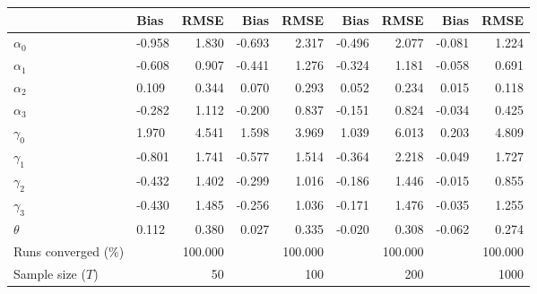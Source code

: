 
\begin{tabular}[t]{llrrrrrrr}
\toprule
  & Bias & RMSE & Bias & RMSE & Bias & RMSE & Bias & RMSE\\
\midrule
$\alpha_{0}$ & -0.958 & 1.830 & -0.693 & 2.317 & -0.496 & 2.077 & -0.081 & 1.224\\
$\alpha_{1}$ & -0.608 & 0.907 & -0.441 & 1.276 & -0.324 & 1.181 & -0.058 & 0.691\\
$\alpha_{2}$ & 0.109 & 0.344 & 0.070 & 0.293 & 0.052 & 0.234 & 0.015 & 0.118\\
$\alpha_{3}$ & -0.282 & 1.112 & -0.200 & 0.837 & -0.151 & 0.824 & -0.034 & 0.425\\
$\gamma_{0}$ & 1.970 & 4.541 & 1.598 & 3.969 & 1.039 & 6.013 & 0.203 & 4.809\\
$\gamma_{1}$ & -0.801 & 1.741 & -0.577 & 1.514 & -0.364 & 2.218 & -0.049 & 1.727\\
$\gamma_{2}$ & -0.432 & 1.402 & -0.299 & 1.016 & -0.186 & 1.446 & -0.015 & 0.855\\
$\gamma_{3}$ & -0.430 & 1.485 & -0.256 & 1.036 & -0.171 & 1.476 & -0.035 & 1.255\\
$\theta$ & 0.112 & 0.380 & 0.027 & 0.335 & -0.020 & 0.308 & -0.062 & 0.274\\
Runs converged (\%) &  & 100.000 &  & 100.000 &  & 100.000 &  & 100.000\\
Sample size ($T$) &  & 50 &  & 100 &  & 200 &  & 1000\\
\bottomrule
\end{tabular}
